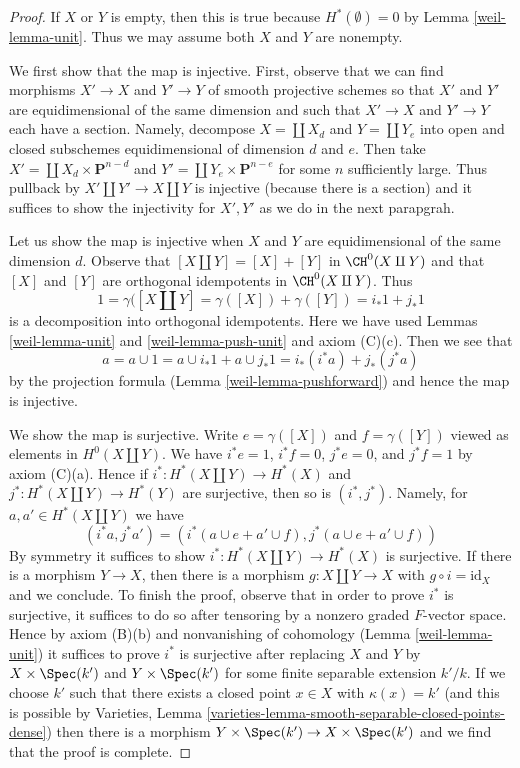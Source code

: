 \begin{proof}

If $X$ or $Y$ is empty, then this is true because
$H^*(\emptyset) = 0$ by Lemma \ref{weil-lemma-unit}.
Thus we may assume both $X$ and $Y$ are nonempty.

\medskip\noindent
We first show that the map is injective. First, observe that
we can find morphisms $X' \to X$ and $Y' \to Y$
of smooth projective schemes so that $X'$ and $Y'$ are
equidimensional of the same dimension and such that
$X' \to X$ and $Y' \to Y$ each have a section. Namely,
decompose $X = \coprod X_d$ and $Y = \coprod Y_e$
into open and closed subschemes equidimensional of
dimension $d$ and $e$. Then take
$X' = \coprod X_d \times \mathbf{P}^{n - d}$
and $Y' = \coprod Y_e \times \mathbf{P}^{n - e}$ for some
$n$ sufficiently large. Thus pullback by
$X' \amalg Y' \to X \amalg Y$ is injective
(because there is a section) and
it suffices to show the injectivity for $X', Y'$
as we do in the next parapgrah.

\medskip\noindent
Let us show the map is injective when $X$ and $Y$ are equidimensional
of the same dimension $d$.
Observe that $[X \amalg Y] = [X] + [Y]$ in $\CH^0(X \amalg Y)$
and that $[X]$ and $[Y]$ are orthogonal idempotents in $\CH^0(X \amalg Y)$.
Thus
$$
1 = \gamma([X \amalg Y] = \gamma([X]) + \gamma([Y]) = i_*1 + j_*1
$$
is a decomposition into orthogonal idempotents. Here we have used
Lemmas \ref{weil-lemma-unit} and \ref{weil-lemma-push-unit} and axiom (C)(c).
Then we see that
$$
a = a \cup 1 = a \cup i_*1 + a \cup j_*1 =
i_*(i^*a) + j_*(j^*a)
$$
by the projection formula (Lemma \ref{weil-lemma-pushforward}) and hence the map
is injective.

\medskip\noindent
We show the map is surjective. Write $e = \gamma([X])$ and $f = \gamma([Y])$
viewed as elements in $H^0(X \amalg Y)$. We have
$i^*e = 1$, $i^*f = 0$, $j^*e = 0$, and $j^*f = 1$ by axiom (C)(a).
Hence if $i^* : H^*(X \amalg Y) \to  H^*(X)$
and $j^* : H^*(X \amalg Y) \to H^*(Y)$ are surjective, then
so is $(i^*, j^*)$. Namely, for $a, a' \in H^*(X \amalg Y)$
we have
$$
(i^*a, j^*a') = (i^*(a \cup e + a' \cup f), j^*(a \cup e + a' \cup f))
$$
By symmetry it suffices to show $i^* : H^*(X \amalg Y) \to  H^*(X)$
is surjective. If there is a morphism $Y \to X$, then there is a morphism
$g : X \amalg Y \to X$ with $g \circ i = \text{id}_X$ and we conclude.
To finish the proof, observe that in order to prove
$i^*$ is surjective, it suffices to do so after tensoring
by a nonzero graded $F$-vector space. Hence by axiom (B)(b)
and nonvanishing of cohomology (Lemma \ref{weil-lemma-unit})
it suffices to prove $i^*$ is surjective after replacing
$X$ and $Y$ by $X \times \Spec(k')$ and $Y \times \Spec(k')$
for some finite separable extension $k'/k$.
If we choose $k'$ such that there exists a closed point
$x \in X$ with $\kappa(x) = k'$ (and this is possible by
Varieties, Lemma \ref{varieties-lemma-smooth-separable-closed-points-dense})
then there is a morphism $Y \times \Spec(k') \to X \times \Spec(k')$
and we find that the proof is complete.
\end{proof}

